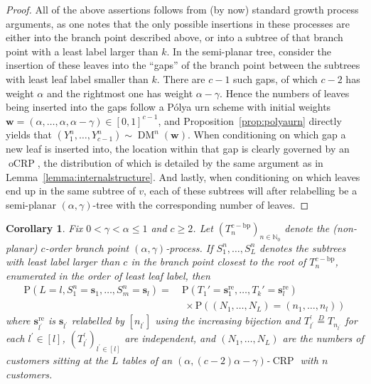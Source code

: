 \documentclass[a4paper, final]{amsart}
\theoremstyle{plain}
\newtheorem{cor}[thm]{Corollary}
\theoremstyle{definition}
\newcommand{\tree}[1][t]{\boldsymbol{#1}}
\DeclareMathOperator{\crp}{CRP}
\DeclareMathOperator{\ocrp}{oCRP}
\DeclareMathOperator{\dirmult}{DM}
\newcommand{\deq}{\stackrel{D}{=}}
\renewcommand{\P}{\mathrm{P}}
\newcommand{\N}{\mathbb{N}}
\begin{document}
%
\begin{proof}
  All of the above assertions follows from (by now) standard growth process arguments, as one notes that the only possible insertions in these processes are either into the branch point described above, or into a subtree of that branch point with a least label larger than $k$.
  In the semi-planar tree, consider the insertion of these leaves into the “gaps” of the branch point between the subtrees with least leaf label smaller than $k$.
  There are $c-1$ such gaps, of which $c-2$ has weight $\alpha$ and the rightmost one has weight $\alpha - \gamma$.
  Hence the numbers of leaves being inserted into the gaps follow a P\'{o}lya urn scheme with initial weights $\mathbf{w} = (\alpha, \ldots, \alpha, \alpha - \gamma) \in {[0,1]}^{c-1}$, and Proposition~\ref{prop:polyaurn} directly yields that $\left( Y_1^n, \ldots, Y_{c-1}^n \right) \sim \dirmult^n(\mathbf{w})$.
  When conditioning on which gap a new leaf is inserted into, the location within that gap is clearly governed by an $\ocrp$, the distribution of which is detailed by the same argument as in Lemma~\ref{lemma:internalstructure}.
  And lastly, when conditioning on which leaves end up in the same subtree of $v$, each of these subtrees will after relabelling be a semi-planar $(\alpha, \gamma)$-tree with the corresponding number of leaves. 
\end{proof}
%
\begin{cor}
  Fix $0 < \gamma < \alpha \leq 1$ and $c \geq 2$.
  Let ${\left( T_{n}^{c-\text{bp}} \right)}_{n \in \N_0}$ denote the (non-planar) $c$-order branch point $(\alpha, \gamma)$-process.
  If $S_1^n, \ldots, S_L^n$ denotes the subtrees with least label larger than $c$ in the branch point closest to the root of $T_n^{c-\text{bp}}$, enumerated in the order of least leaf label, then
  \begin{align*}
    \P \left( L = l, S_1^n = {\tree[s]}_1, \ldots, S_m^n = {\tree[s]}_l \right)
    = \
    &\P \left( T_1' = {\tree[s]}_1^\text{re}, \ldots, T_k' = {\tree[s]}_l^\text{re} \right) \\ 
    &\ \times \P \left( \left(N_1, \ldots, N_L \right) = \left( n_1, \ldots, n_l \right) \right)
  \end{align*}
  where ${\tree[s]}_{l^\prime}^\text{re}$ is ${\tree[s]}_{l^\prime}$ relabelled by $[n_{l^\prime}]$ using the increasing bijection and $T_{l^\prime}^\prime \deq T_{n_{l^\prime}}$ for each $l^\prime \in [l]$, ${\left( T_{l^\prime}^\prime \right)}_{l^\prime \in [l]}$ are independent, and $\left( N_1, \ldots, N_L \right)$ are the numbers of customers sitting at the $L$ tables of an $(\alpha, (c - 2)\alpha - \gamma)$-$\crp$ with $n$ customers.
\end{cor}
\end{document}
